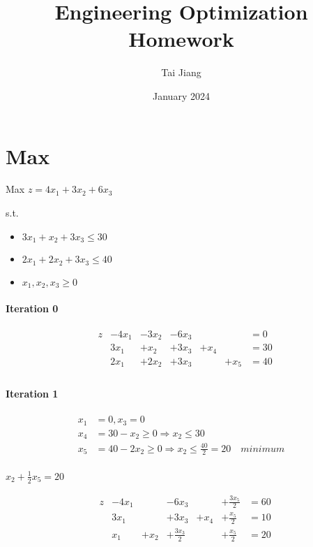 \documentclass{article}
\title{Engineering Optimization Homework}
\author{Tai Jiang}
\date{January 2024}
\begin{document}
  \maketitle
  \section{Max}
  Max $z = 4x_1 + 3x_2 + 6x_3$


  s.t.
  \begin{itemize}
    \item $3x_1 + x_2 + 3x_3 \leq 30$
    \item $2x_1 + 2x_2 + 3x_3 \leq 40$
    \item $x_1, x_2, x_3 \geq 0$
  \end{itemize}

\paragraph{Iteration 0}
  

\begin{equation}
  \begin{aligned}
    &z  &-4x_1 &-3x_2  &-6x_3 & & &= 0 \\
    & &3x_1  &+x_2  &+3x_3  &+x_4 & &= 30 \\
    & &2x_1  &+2x_2  &+3x_3  & &+x_5 &= 40 \\
  \end{aligned}
\end{equation}


\paragraph{Iteration 1}


\begin{equation}
  \begin{aligned}
    x_1 &= 0, x_3 = 0 \\
    x_4 &= 30 - x_2 \geq 0 \Rightarrow x_2 \leq 30 \\
    x_5 &= 40 - 2x_2 \geq 0 \Rightarrow x_2 \leq \frac{40}{2} = 20 \quad minimum \\
  \end{aligned}
\end{equation}

$x_2 + \frac{1}{2}x_5 = 20$

\begin{equation}
  \begin{aligned}
    &z  &-4x_1 &  &-6x_3 & &+\frac{3x_5}{2} &= 60 \\
    & &3x_1  &  &+3x_3  &+x_4 &+\frac{x_5}{2} &= 10 \\
    & &x_1  &+x_2  &+\frac{3x_3}{2}  & &+\frac{x_5}{2} &= 20 \\
  \end{aligned}
\end{equation}
\end{document}
